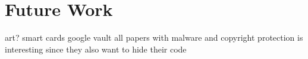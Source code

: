 \section{Future Work}\label{section:conclusion-future}
art?\newline
smart cards\newline
google vault\newline
all papers with malware and copyright protection is interesting since they also want to hide their code\newline
